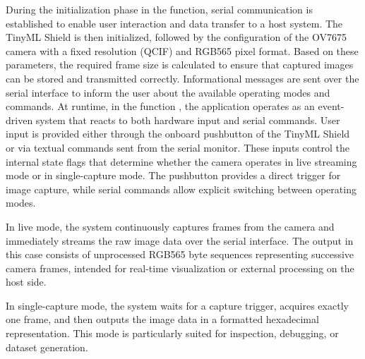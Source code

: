 During the initialization phase in the  function, serial communication is established to enable user interaction and data transfer to a host system. The TinyML Shield is then initialized, followed by the configuration of the OV7675 camera with a fixed resolution (QCIF) and RGB565 pixel format. Based on these parameters, the required frame size is calculated to ensure that captured images can be stored and transmitted correctly. Informational messages are sent over the serial interface to inform the user about the available operating modes and commands. At runtime, in the function , the application operates as an event-driven system that reacts to both hardware input and serial commands. User input is provided either through the onboard pushbutton of the TinyML Shield or via textual commands sent from the serial monitor. These inputs control the internal state flags that determine whether the camera operates in live streaming mode or in single-capture mode. The pushbutton provides a direct trigger for image capture, while serial commands allow explicit switching between operating modes.

In live mode, the system continuously captures frames from the camera and immediately streams the raw image data over the serial interface. The output in this case consists of unprocessed RGB565 byte sequences representing successive camera frames, intended for real-time visualization or external processing on the host side.

In single-capture mode, the system waits for a capture trigger, acquires exactly one frame, and then outputs the image data in a formatted hexadecimal representation. This mode is particularly suited for inspection, debugging, or dataset generation.


\begin{center}
	
	\label{lst:OV7675Test}
\end{center}





